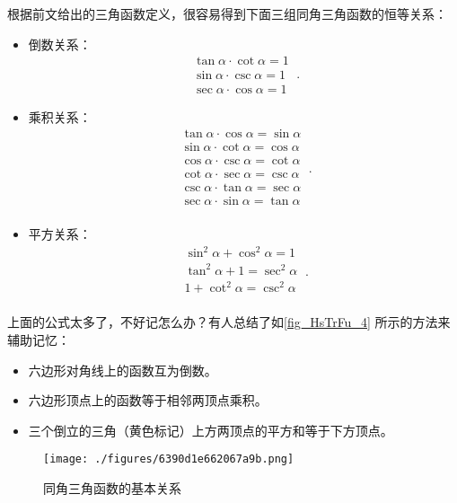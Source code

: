 根据前文给出的三角函数定义，很容易得到下面三组同角三角函数的恒等关系：
\begin{itemize}
\item 倒数关系：
\begin{equation}\label{eq_HsTrFu_1}
\begin{split}
\tan \alpha \cdot \cot \alpha = 1\\
\sin \alpha \cdot  \csc \alpha = 1\\
\sec \alpha  \cdot \cos \alpha = 1
\end{split}~.
\end{equation}
\item 乘积关系：
\begin{equation}\label{eq_HsTrFu_2}
\begin{split}
\tan \alpha \cdot\cos \alpha= \sin \alpha\\
\sin \alpha \cdot\cot \alpha= \cos \alpha\\
\cos \alpha \cdot\csc \alpha= \cot \alpha\\
\cot \alpha \cdot\sec \alpha= \csc \alpha\\
\csc \alpha \cdot\tan \alpha= \sec \alpha\\
\sec \alpha \cdot\sin \alpha= \tan \alpha\\
\end{split}~.
\end{equation}
\item 平方关系：
\begin{equation}\label{eq_HsTrFu_3}
\begin{split}
\sin ^{2} \alpha + \cos ^{2}\alpha =1\\
\tan  ^{2} \alpha + 1 =\sec ^{2}\alpha\\
1 + \cot ^{2}\alpha =\csc ^{2}\alpha\\
\end{split}~.
\end{equation}
\end{itemize}
上面的公式太多了，不好记怎么办？有人总结了如\autoref{fig_HsTrFu_4} 所示的方法来辅助记忆：
\begin{itemize}
\item 六边形对角线上的函数互为倒数。
\item 六边形顶点上的函数等于相邻两顶点乘积。
\item 三个倒立的三角（黄色标记）上方两顶点的平方和等于下方顶点。
\end{itemize}
\begin{figure}[ht]
\centering
\texttt{[image: ./figures/6390d1e662067a9b.png]}
\caption{同角三角函数的基本关系} \label{fig_HsTrFu_4}
\end{figure}

